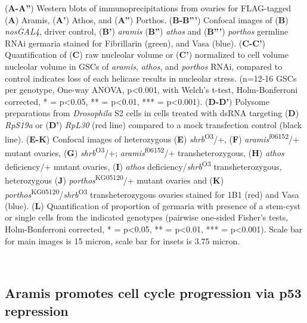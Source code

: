\documentclass[12pt,oneside]{reedthesis}
\begin{document}
\setlength\parindent{0pt}(\textbf{A-A''}) Western blots of immunoprecipitations from ovaries for FLAG-tagged (\textbf{A}) Aramis, (\textbf{A'}) Athos, and (\textbf{A''}) Porthos. (\textbf{B-B'''}) Confocal images of (\textbf{B}) \emph{nosGAL4}, driver control, (\textbf{B'}) \emph{aramis} (\textbf{B''}) \emph{athos} and (\textbf{B'''}) \emph{porthos} germline RNAi germaria stained for Fibrillarin (green), and Vasa (blue). (\textbf{C-C'}) Quantification of (\textbf{C}) raw nucleolar volume or (\textbf{C'}) normalized to cell volume nucleolar volume in GSCs of \emph{aramis}, \emph{athos}, and \emph{porthos} RNAi, compared to control indicates loss of each helicase results in nucleolar stress. (n=12-16 GSCs per genotype, One-way ANOVA, p\textless0.001, with Welch's t-test, Holm-Bonferroni corrected, * = p\textless0.05, ** = p\textless0.01, *** = p\textless0.001). (\textbf{D-D'}) Polysome preparations from \emph{Drosophila} S2 cells in cells treated with dsRNA targeting (\textbf{D}) \emph{RpS19a} or (\textbf{D'}) \emph{RpL30} (red line) compared to a mock transfection control (black line). (\textbf{E-K}) Confocal images of heterozygous (\textbf{E}) \emph{shrb}\textsuperscript{O3}/+, (\textbf{F}) \emph{aramis}\textsuperscript{f06152}/+ mutant ovaries, (\textbf{G}) \emph{shrb}\textsuperscript{O3}/+; \emph{aramis}\textsuperscript{f06152}/+ transheterozygous, (\textbf{H}) \emph{athos} deficiency/+ mutant ovaries, (\textbf{I}) \emph{athos} deficiency/\emph{shrb}\textsuperscript{O3} transheterozygous, heterozygous (\textbf{J}) \emph{porthos}\textsuperscript{KG05120}/+ mutant ovaries and (\textbf{K}) \emph{porthos}\textsuperscript{KG05120}/\emph{shrb}\textsuperscript{O3} transheterozygous ovaries stained for 1B1 (red) and Vasa (blue). (\textbf{L}) Quantification of proportion of germaria with presence of a stem-cyst or single cells from the indicated genotypes (pairwise one-sided Fisher's tests, Holm-Bonferroni corrected, * = p\textless0.05, ** = p\textless0.01, *** = p\textless0.001). Scale bar for main images is 15 micron, scale bar for insets is 3.75 micron.


\textbf{\\
}

\hypertarget{aramis-promotes-cell-cycle-progression-via-p53-repression}{%
\subsection{Aramis promotes cell cycle progression via p53 repression}\label{aramis-promotes-cell-cycle-progression-via-p53-repression}}
\end{document}
